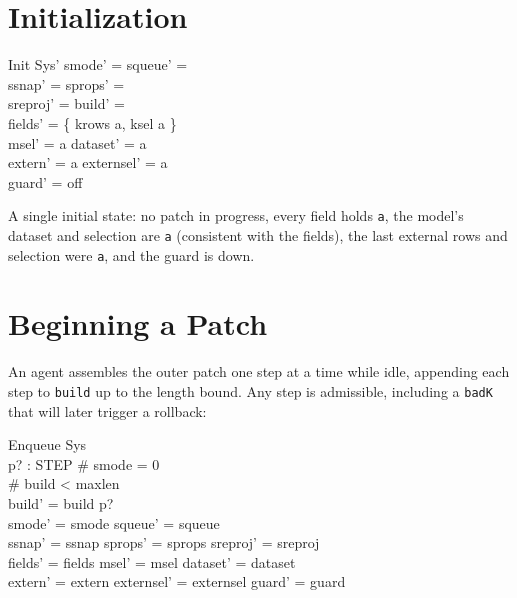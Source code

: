 \documentclass[a4paper,10pt,fleqn]{article}
\begin{document}
\section{Initialization}

\begin{schema}{Init}
  Sys'
\where
  smode' = \langle \rangle \land squeue' = \langle \rangle \\
  \land ssnap' = \langle \rangle \land sprops' = \langle \rangle \\
  \land sreproj' = \langle \rangle \land build' = \langle \rangle \\
  fields' = \{ krows \mapsto a, ksel \mapsto a \} \\
  msel' = a \land dataset' = a \\
  extern' = a \land externsel' = a \\
  guard' = off
\end{schema}

A single initial state: no patch in progress, every field holds \texttt{a}, the
model's dataset and selection are \texttt{a} (consistent with the fields), the
last external rows and selection were \texttt{a}, and the guard is down.

\section{Beginning a Patch}

An agent assembles the outer patch one step at a time while idle, appending each
step to \texttt{build} up to the length bound.  Any step is admissible, including
a \texttt{badK} that will later trigger a rollback:

\begin{schema}{Enqueue}
  \Delta Sys \\
  p? : STEP
\where
  \# smode = 0 \\
  \# build < maxlen \\
  build' = build \cat \langle p? \rangle \\
  smode' = smode \land squeue' = squeue \\
  \land ssnap' = ssnap \land sprops' = sprops \land sreproj' = sreproj \\
  fields' = fields \land msel' = msel \land dataset' = dataset \\
  \land extern' = extern \land externsel' = externsel \land guard' = guard
\end{schema}
\end{document}
